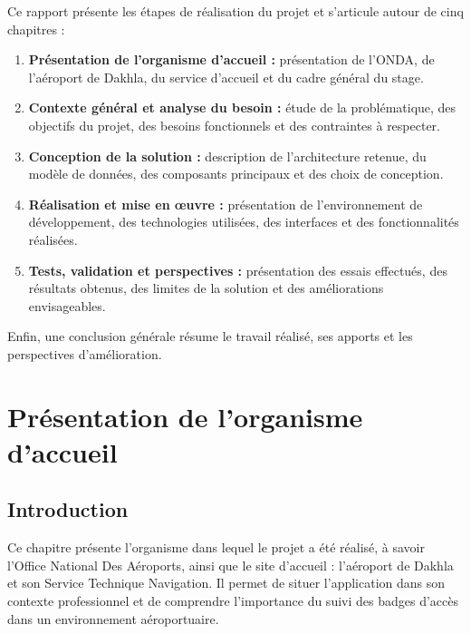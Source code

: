 \documentclass[12pt,a4paper,openany]{report}
\begin{document}
Ce rapport présente les étapes de réalisation du projet et s'articule autour de
cinq chapitres :

\begin{enumerate}
    \item \textbf{Présentation de l'organisme d'accueil :}
    présentation de l'ONDA, de l'aéroport de Dakhla, du service d'accueil et du
    cadre général du stage.
    
    \item \textbf{Contexte général et analyse du besoin :}
    étude de la problématique, des objectifs du projet, des besoins fonctionnels
    et des contraintes à respecter.

    \item \textbf{Conception de la solution :}
    description de l'architecture retenue, du modèle de données, des composants
    principaux et des choix de conception.

    \item \textbf{Réalisation et mise en œuvre :}
    présentation de l'environnement de développement, des technologies utilisées,
    des interfaces et des fonctionnalités réalisées.

    \item \textbf{Tests, validation et perspectives :}
    présentation des essais effectués, des résultats obtenus, des limites de la
    solution et des améliorations envisageables.
\end{enumerate}

Enfin, une conclusion générale résume le travail réalisé, ses apports et les
perspectives d'amélioration.


\chapter{Présentation de l'organisme d'accueil}

\section{Introduction}

Ce chapitre présente l'organisme dans lequel le projet a été réalisé, à savoir
l'Office National Des Aéroports, ainsi que le site d'accueil : l'aéroport de
Dakhla et son Service Technique Navigation. Il permet de situer l'application
dans son contexte professionnel et de comprendre l'importance du suivi des badges
d'accès dans un environnement aéroportuaire.
\end{document}
